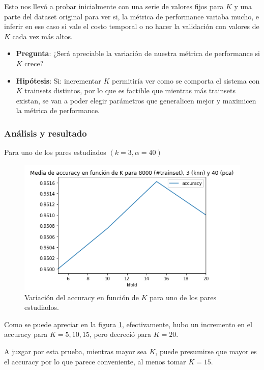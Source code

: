 Esto nos llevó a probar inicialmente con una serie de valores fijos para $K$ y una parte del dataset original para ver si, la métrica de performance variaba mucho, e inferir en ese caso si vale el costo temporal o no hacer la validación con valores de $K$ cada vez más altos.

\begin{itemize}
    \item \textbf{Pregunta}: ¿Será apreciable la variación de nuestra métrica de performance si $K$ crece?
    \item \textbf{Hipótesis}: Si: incrementar $K$ permitiría ver como se comporta el sistema con $K$ trainsets distintos, por lo que es factible que mientras más trainsets existan, se van a poder elegir parámetros que generalicen mejor y maximicen la métrica de performance.
\end{itemize}

\subsubsection*{Análisis y resultado}

Para uno de los pares estudiados $(k = 3, \alpha = 40)$

\begin{figure}[H]
    \centering
    \includegraphics[scale=0.7]{images/KFoldIncreasingK.png}
    \caption{Variación del accuracy en función de $K$ para uno de los pares estudiados.}
    \label{fig:KFoldIncreasingK}
\end{figure}

Como se puede apreciar en la figura \ref{fig:KFoldIncreasingK}, efectivamente, hubo un incremento en el accuracy para $K=5, 10, 15$, pero decreció para $K=20$.

A juzgar por esta prueba, mientras mayor sea $K$, puede presumirse que mayor es el accuracy por lo que parece conveniente, al menos tomar $K=15$.

